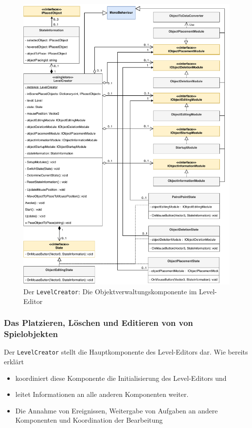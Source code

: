 \begin {figure}[H]
	\begin {center}
	    \includegraphics[width=1\textwidth]{pics/leveleditor_levelcreator_compressed.pdf}
		\caption{Der \texttt{LevelCreator}: Die Objektverwaltungskomponente im Level-Editor}
		\label{fig:leveleditor_levelcreator}
	\end {center}
\end {figure}

\subsubsection{Das Platzieren, Löschen und Editieren von 
von Spielobjekten}
Der \texttt{LevelCreator} stellt die Hauptkomponente des Level-Editors dar. Wie bereits erklärt

\begin{itemize}
	\item koordiniert diese Komponente die Initialisierung des Level-Editors und
	\item leitet Informationen an alle anderen Komponenten weiter.
	\item Die Annahme von Ereignissen, Weitergabe von Aufgaben an andere Komponenten und Koordination der Bearbeitung
\end{itemize}

